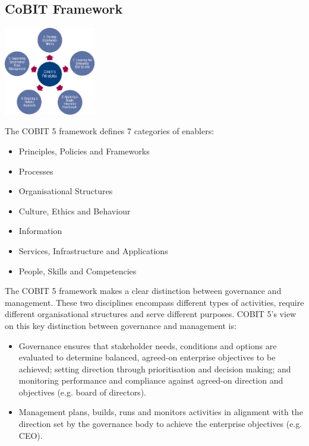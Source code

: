 \documentclass[a4]{article}
\begin{document}
\begin{multicols}{3}
\section{CoBIT Framework}
\begin{center}
    \includegraphics[width=4cm]{cobit-fw.jpg}\\
\end{center}
\noindent
The COBIT 5 framework defines
7 categories of enablers:
\begin{itemize}
    \item Principles, Policies and Frameworks
    \item Processes
    \item Organisational Structures
    \item Culture, Ethics and Behaviour
    \item Information
    \item Services, Infrastructure and Applications
    \item People, Skills and Competencies
\end{itemize}
\vspace{1em}
\noindent
The COBIT 5 framework makes a clear distinction between
governance and management. These two disciplines encompass
different types of activities, require different organisational structures
and serve different purposes. COBIT 5’s view on this key distinction
between governance and management is:

\begin{itemize}
    \item Governance ensures that stakeholder needs, conditions and options
    are evaluated to determine balanced, agreed-on enterprise objectives
    to be achieved; setting direction through prioritisation and decision
    making; and monitoring performance and compliance against
    agreed-on direction and objectives (e.g. board of directors).
    \item Management plans, builds, runs and monitors activities in alignment
    with the direction set by the governance body to achieve the
    enterprise objectives (e.g. CEO).
\end{itemize}


\end{multicols}
\end{document}
